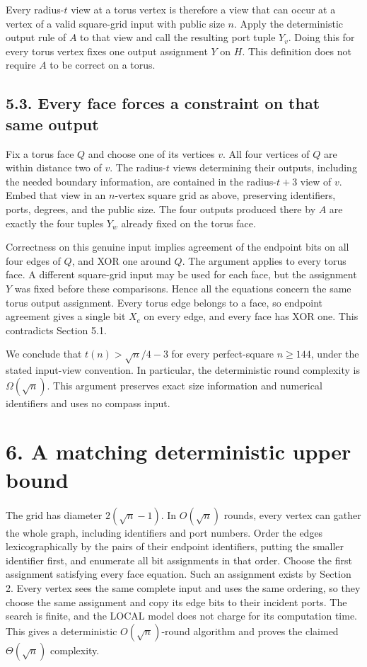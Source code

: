 \documentclass[11pt,a4paper]{article}
\begin{document}
Every radius-\(t\) view at a torus vertex is therefore a view that can occur at a vertex of a valid square-grid input with public size \(n\).
Apply the deterministic output rule of \(A\) to that view and call the resulting port tuple \(Y_v\).
Doing this for every torus vertex fixes one output assignment \(Y\) on \(H\).
This definition does not require \(A\) to be correct on a torus.

\subsection{5.3. Every face forces a constraint on that same output}

Fix a torus face \(Q\) and choose one of its vertices \(v\).
All four vertices of \(Q\) are within distance two of \(v\).
The radius-\(t\) views determining their outputs, including the needed boundary information, are contained in the radius-\(t+3\) view of \(v\).
Embed that view in an \(n\)-vertex square grid as above, preserving identifiers, ports, degrees, and the public size.
The four outputs produced there by \(A\) are exactly the four tuples \(Y_w\) already fixed on the torus face.

Correctness on this genuine input implies agreement of the endpoint bits on all four edges of \(Q\), and XOR one around \(Q\).
The argument applies to every torus face.
A different square-grid input may be used for each face, but the assignment \(Y\) was fixed before these comparisons.
Hence all the equations concern the same torus output assignment.
Every torus edge belongs to a face, so endpoint agreement gives a single bit \(X_e\) on every edge, and every face has XOR one.
This contradicts Section 5.1.

We conclude that \(t(n)>\sqrt n/4-3\) for every perfect-square \(n\ge144\), under the stated input-view convention.
In particular, the deterministic round complexity is \(\Omega(\sqrt n)\).
This argument preserves exact size information and numerical identifiers and uses no compass input.

\section{6. A matching deterministic upper bound}\label{grid-upper-bound}

The grid has diameter \(2(\sqrt n-1)\).
In \(O(\sqrt n)\) rounds, every vertex can gather the whole graph, including identifiers and port numbers.
Order the edges lexicographically by the pairs of their endpoint identifiers, putting the smaller identifier first, and enumerate all bit assignments in that order.
Choose the first assignment satisfying every face equation.
Such an assignment exists by Section 2.
Every vertex sees the same complete input and uses the same ordering, so they choose the same assignment and copy its edge bits to their incident ports.
The search is finite, and the LOCAL model does not charge for its computation time.
This gives a deterministic \(O(\sqrt n)\)-round algorithm and proves the claimed \(\Theta(\sqrt n)\) complexity.
\end{document}
